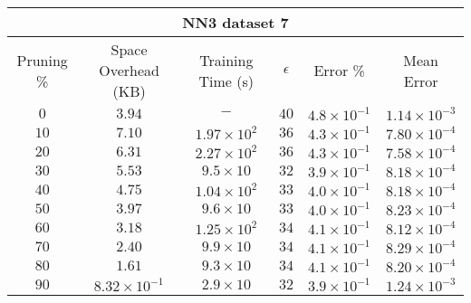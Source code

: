 \begin{adjustwidth}{0cm}{}
\begin{tabular}{cccccc}
\hline
\multicolumn{6}{c}{NN3 dataset 7} \\
\toprule
Pruning \% & Space Overhead (KB) & Training Time (s) & $\epsilon$ & Error \% & Mean Error\\
\midrule
$0$ & $3.94$ & $-$ & $40$ & $4.8 \times 10^{-1}$ & $1.14 \times 10^{-3}$\\
$10$ & $7.10$ & $1.97  \times 10^{2}$ & $36$ & $4.3 \times 10^{-1}$ & $7.80 \times 10^{-4}$\\
$20$ & $6.31$ & $2.27 \times 10^{2}$ & $36$ & $4.3 \times 10^{-1}$ & $7.58 \times 10^{-4}$\\
$30$ & $5.53$ & $9.5 \times 10$ & $32$ & $3.9 \times 10^{-1}$ & $8.18 \times 10^{-4}$\\
$40$ & $4.75$ & $1.04 \times 10^{2}$ & $33$ & $4.0 \times 10^{-1}$ & $8.18 \times 10^{-4}$\\
$50$ & $3.97$ & $9.6 \times 10$ & $33$ & $4.0 \times 10^{-1}$ & $8.23 \times 10^{-4}$\\
$60$ & $3.18$ & $1.25 \times 10^{2}$ & $34$ & $4.1 \times 10^{-1}$ & $8.12 \times 10^{-4}$\\
$70$ & $2.40$ & $9.9 \times 10$ & $34$ & $4.1 \times 10^{-1}$ & $8.29 \times 10^{-4}$\\
$80$ & $1.61$ & $9.3 \times 10$ & $34$ & $4.1 \times 10^{-1}$ & $8.20 \times 10^{-4}$\\
$90$ & $8.32 \times 10^{-1}$ & $2.9 \times 10$ & $32$ & $3.9 \times 10^{-1}$ & $1.24 \times 10^{-3}$\\
\bottomrule
\end{tabular}
\end{adjustwidth}

\null\par\null


